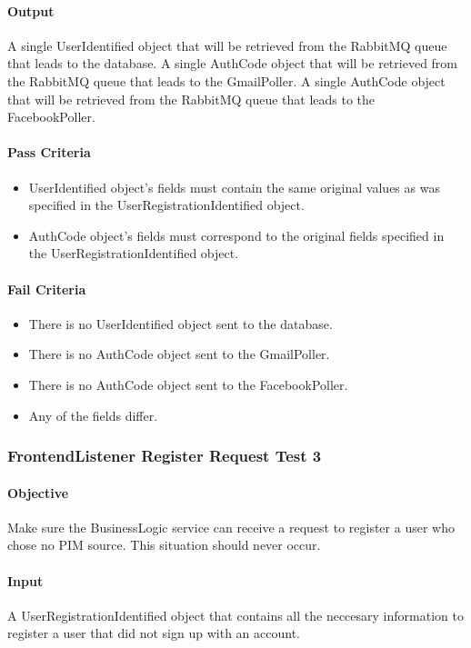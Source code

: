 \documentclass[hidelinks,english]{article}
\begin{document}
				\paragraph{Output} A single UserIdentified object that will be retrieved from the RabbitMQ queue that leads to the database. A single AuthCode object that will be retrieved from the RabbitMQ queue that leads to the GmailPoller. A single AuthCode object that will be retrieved from the RabbitMQ queue that leads to the FacebookPoller.
				\paragraph{Pass Criteria}
				\begin{itemize}
					\item UserIdentified object's fields must contain the same original values as was specified in the UserRegistrationIdentified object.
					\item AuthCode object's fields must correspond to the original fields specified in the UserRegistrationIdentified object.
				\end{itemize}
				\paragraph{Fail Criteria}
				\begin{itemize}
					\item There is no UserIdentified object sent to the database.
					\item There is no AuthCode object sent to the GmailPoller.
					\item There is no AuthCode object sent to the FacebookPoller.
					\item Any of the fields differ.
				\end{itemize}
			
			\subsubsection{FrontendListener Register Request Test 3}\label{businessfrontendlistenerregistertest3}
				\paragraph{Objective} Make sure the BusinessLogic service can receive a request to register a user who chose no PIM source. This situation should never occur.
				\paragraph{Input} A UserRegistrationIdentified object that contains all the neccesary information to register a user that did not sign up with an account.
\end{document}
